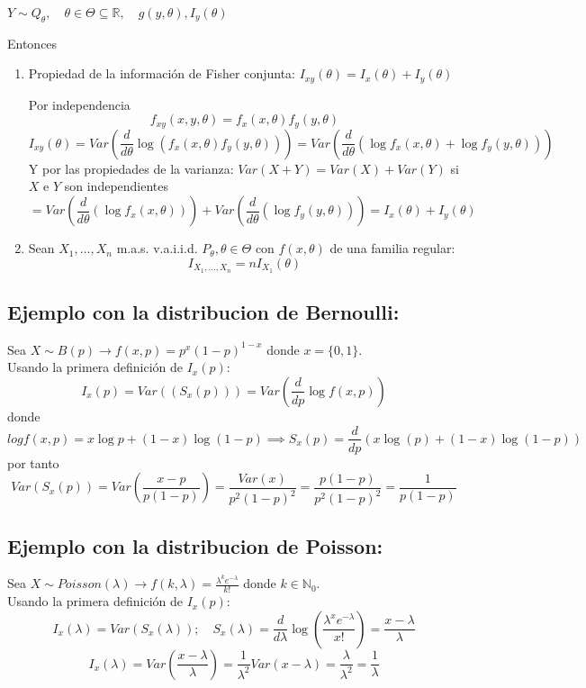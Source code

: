 $Y \sim Q_\theta, \quad \theta \in \Theta \subseteq \mathbb{R}, \quad g(y,\theta), I_y(\theta)$

Entonces
\begin{enumerate}
    \item Propiedad de la información de Fisher conjunta: $I_{xy}(\theta) = I_x(\theta)+I_y(\theta)$
          \begin{proofs} Por independencia
              \[
                  f_{xy}(x,y,\theta)=f_x(x,\theta)  f_y(y,\theta)
              \]
              \[
                  I_{xy}(\theta)=Var\left(\frac{d}{d \theta} \log (f_x(x,\theta)  f_y(y,\theta))\right)=Var\left(\frac{d}{d \theta} (\log f_x(x,\theta) + \log f_y(y,\theta))\right)
              \]
              Y por las propiedades de la varianza: $Var(X+Y)= Var(X)+Var(Y)$ si $X$ e $Y$ son independientes
              \[
                  =Var\left(\frac{d}{d \theta} (\log f_x(x,\theta))\right) + Var\left(\frac{d}{d \theta} (\log f_y(y,\theta))\right)=I_x(\theta)+I_y(\theta)
              \]
          \end{proofs}
    \item Sean $X_1, \dots, X_n$ m.a.s. v.a.i.i.d. $P_\theta,\theta \in \Theta$ con $f(x,\theta)$ de una familia regular:
          \[
              I_{X_1,\dots,X_n}=n  I_{X_1}(\theta)
          \]
\end{enumerate}

\subsection*{Ejemplo con la distribucion de Bernoulli:}

Sea $X \sim B(p) \to f(x,p)=p^x (1-p)^{1-x}$ donde $x=\{0,1\}$. \\Usando la primera definición de $I_x(p)$:
\[
    I_x(p)=Var((S_x(p)))=Var\left(\frac{d}{dp} \log f(x,p)\right)
\]
donde
\[
    log f(x,p)=x \log p + (1-x)\log(1-p) \implies S_x(p)=\frac{d}{dp}(x \log (p)+ (1-x)\log (1-p))
\]
por tanto
\[
    Var(S_x(p))=Var\left(\frac{x-p}{p(1-p)}\right)=\frac{Var(x)}{p^2(1-p)^2}=\frac{p(1-p)}{p^2(1-p)^2}=\frac{1}{p(1-p)}
\]

\subsection*{Ejemplo con la distribucion de Poisson:}

Sea $X \sim Poisson(\lambda) \to f(k,\lambda)=\frac{\lambda^ke^{-\lambda}}{k!}$ donde $k \in \mathbb{N}_0$. \\Usando la primera definición de $I_x(p)$:
\[
    I_x(\lambda)=Var(S_x(\lambda)); \quad S_x(\lambda) = \frac{d}{d \lambda} \log\left(\frac{\lambda^x e^{-\lambda}}{x!}\right)=\frac{x-\lambda}{\lambda}
\]
\[
    I_x(\lambda) = Var\left(\frac{x-\lambda}{\lambda}\right)=\frac{1}{\lambda^2}Var(x-\lambda)=\frac{\lambda}{\lambda^2}=\frac{1}{\lambda}
\]

